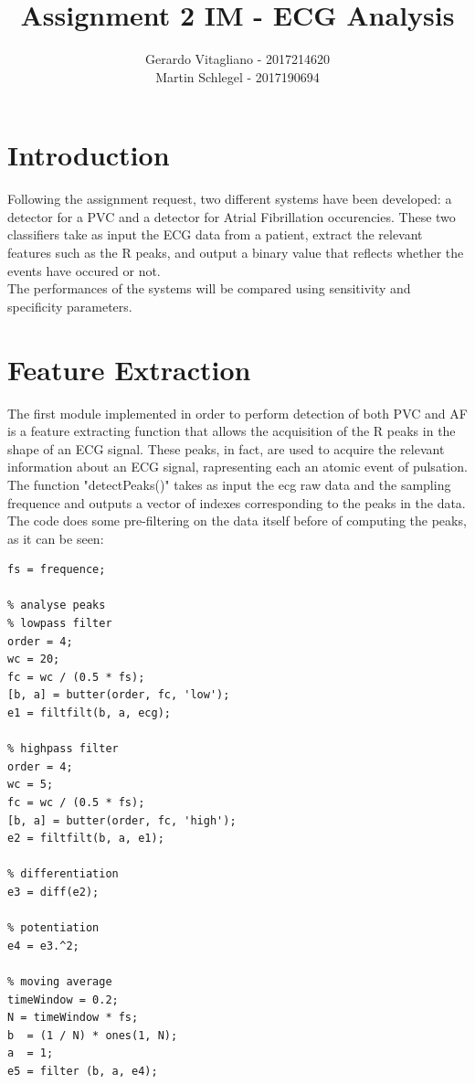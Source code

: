 \documentclass[a4paper,titlepage]{article}
\begin{document}
\title{Assignment 2 IM - ECG Analysis}
\author{Gerardo Vitagliano - 2017214620 \\ Martin Schlegel - 2017190694 }
\date{\vspace{-5ex}}
\vfill
\maketitle
\clearpage
\section{Introduction}
Following the assignment request, two different systems have been developed: a detector for a PVC and a detector for Atrial Fibrillation occurencies. These two classifiers take as input the ECG data from a patient, extract the relevant features such as the R peaks, and output a binary value that reflects whether the events have occured or not.\\
The performances of the systems will be compared using sensitivity and specificity parameters.


\section{Feature Extraction}
The first module implemented in order to perform detection of both PVC and AF is a feature extracting function that allows the acquisition of the R peaks in the shape of an ECG signal. These peaks, in fact, are used to acquire the relevant information about an ECG signal, rapresenting each an atomic event of pulsation.\\
The function "detectPeaks()" takes as input the ecg raw data and the sampling frequence and outputs a vector of indexes corresponding to the peaks in the data.
The code does some pre-filtering on the data itself before of computing the peaks, as it can be seen:
\begin {lstlisting}[caption=Pre-filtering]
fs = frequence;

order = 4;
wc = 20;
fc = wc / (0.5 * fs);
[b, a] = butter(order, fc, 'low');
e1 = filtfilt(b, a, ecg);

order = 4;
wc = 5;
fc = wc / (0.5 * fs);
[b, a] = butter(order, fc, 'high');
e2 = filtfilt(b, a, e1);

e3 = diff(e2);

e4 = e3.^2;

timeWindow = 0.2;
N = timeWindow * fs;
b  = (1 / N) * ones(1, N);
a  = 1;
e5 = filter (b, a, e4);
\end{lstlisting}
\end{document}
